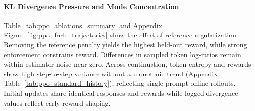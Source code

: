\documentclass{article}
\begin{document}
\begin{table}[t]
\centering
\caption{Operational and held-out evaluation across PPO clipping thresholds ($\epsilon$) and reference KL penalties ($\beta_{\text{KL}}$) on \texttt{rl\_prompt\_pool\_eval} ($N = 200$). The midpoint baseline was not precomputed on held-out prompts ($N=200$); on 32 cached rollouts, its reward is $1.104$ with length $275.4$. The default fork row reflects the bit-identical trajectory shared by $\epsilon = 0.20$, $\epsilon = 0.50$, and $\beta_{\text{KL}} = 0.10$. Cached clip fraction measures tokens bounded on cached rollouts.}
\label{tab:ppo_ablations_summary}
\end{table}

\paragraph{KL Divergence Pressure and Mode Concentration}
Table~\ref{tab:ppo_ablations_summary} and Appendix Figure~\ref{fig:ppo_fork_trajectories} show the effect of reference regularization. Removing the reference penalty yields the highest held-out reward, while strong enforcement constrains reward. Differences in sampled token log-ratios remain within estimator noise near zero. Across continuation, token entropy and rewards show high step-to-step variance without a monotonic trend (Appendix Table~\ref{tab:ppo_standard_history}), reflecting single-prompt online rollouts. Initial updates share identical responses and rewards while logged divergence values reflect early reward shaping.
\end{document}
